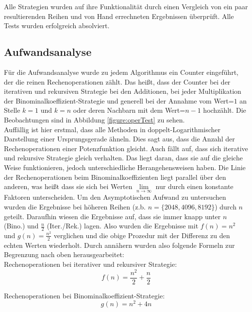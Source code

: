 \documentclass[11pt]{scrartcl}
\begin{document}
		Alle Strategien wurden auf ihre Funktionalität durch einen Vergleich von ein paar resultierenden Reihen und von Hand errechneten Ergebnissen überprüft.
		Alle Tests wurden erfolgreich absolviert.
	
	\subsection{Aufwandsanalyse}
		\label{sec:aufwand}
		
		Für die Aufwandsanalyse wurde zu jedem Algorithmus ein Counter eingeführt, der die reinen Rechenoperationen zählt. 
		Das heißt, dass der Counter bei der iterativen und rekursiven Strategie bei den Additionen, 
		bei jeder Multiplikation der Binominalkoeffizient-Strategie 
		und generell bei der Annahme vom Wert=$1$ an Stelle $k=1$ und $k=n$ oder deren Nachbarn mit dem Wert=$n-1$ hochzählt.
		Die Beobachtungen sind in Abbildung \ref{figure:operTest} zu sehen.\\
		
		Auffällig ist hier erstmal, dass alle Methoden in doppelt-Logarithmischer Darstellung einer Ursprungsgerade ähneln. 
		Dies sagt aus, dass die Anzahl der Rechenoperationen einer Potenzfunktion gleicht.
		Auch fällt auf, dass sich iterative und rekursive Strategie gleich verhalten.
		Das liegt daran, dass sie auf die gleiche Weise funktionieren, jedoch unterschiedliche Herangehensweisen haben.
		Die Linie der Rechenoperationen beim Binominalkoeffizienten liegt parallel über den anderen, 
		was heißt dass sie sich bei Werten $\lim\limits_{n \to \infty}$ nur durch einen konstante Faktoren unterscheiden.
		Um den Asymptotischen Aufwand zu untersuchen wurden die Ergebnisse bei höheren Reihen (z.b. $n=\{2048, 4096, 8192\}$) durch $n$ geteilt.
		Daraufhin wiesen die Ergebnisse auf, dass sie immer knapp unter $n$ (Bino.) und $\frac{n}{2}$ (Iter./Rek.) lagen.
		Also wurden die Ergebnisse mit $f(n)=n^{2}$ und $g(n)=\frac{n^{2}}{2}$ verglichen und die obige Prozedur mit der Differenz zu den echten Werten wiederholt.
		Durch annähern wurden also folgende Formeln zur Begrenzung nach oben herausgearbeitet:\\

		Rechenoperationen bei iterativer und rekursiver Strategie:
		\begin{equation*}
		f(n) = \frac{n^{2}}{2}+\frac{n}{2}
		\end{equation*}

		Rechenoperationen bei Binominalkoeffizient-Strategie:
		\begin{equation*}
		g(n) = n^{2}+4n
		\end{equation*}
\end{document}
